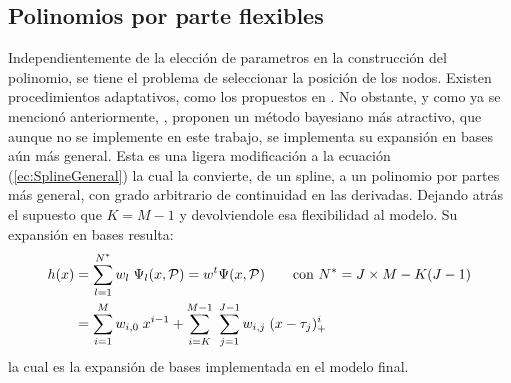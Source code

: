 \documentclass[../Main/Main.tex]{subfiles}
\begin{document}
\subsection{Polinomios por parte flexibles}
Independientemente de la elección de parametros en la construcción del polinomio, se tiene el problema de seleccionar la posición de los nodos. Existen procedimientos adaptativos, como los propuestos en \citet{friedman1991multivariate}. No obstante, y como ya se mencionó anteriormente, \citet{mallik1998automatic}, proponen un método bayesiano más atractivo, que aunque no se implemente en este trabajo, se implementa su expansión en bases aún más general. Esta es una ligera modificación a la ecuación (\ref{ec:SplineGeneral}) la cual la convierte, de un spline, a un polinomio por partes más general, con grado arbitrario de continuidad en las derivadas. Dejando atrás el supuesto que $K = M-1$ y devolviendole esa flexibilidad al modelo. Su expansión en bases resulta:
\begin{align}
	h(x) &= \sum_{l = 1}^{N^*} w_l \; \Psi_l(x,\mathcal{P}) = w^t\Psi(x,\mathcal{P}) \qquad \text{con  } N^* = J\times M - K(J-1) 
\label{ec:ExpBase_NEstrella} \\ 
 		 &=	\sum_{i = 1}^M w_{i,0} \; x^{i-1} + 
			\sum_{i = K}^{M-1} \;
	 		\sum_{j = 1}^{J-1}w_{i,j}\;(x - \tau_j)_+^{i}
	 			\label{ec:PoliMallik}
\end{align}
la cual es la expansión de bases implementada en el modelo final.
\end{document}
